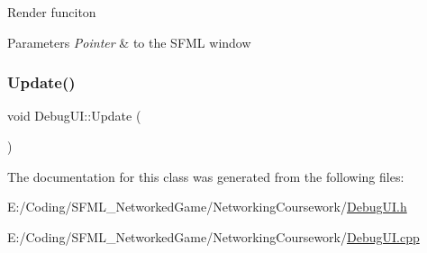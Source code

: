 Render funciton


\begin{DoxyParams}{Parameters}
{\em Pointer} & to the S\+F\+ML window \\
\hline
\end{DoxyParams}
\hypertarget{class_debug_u_i_a9cd779b785ef78f23ad8fb0f9e5e469a}{}\label{class_debug_u_i_a9cd779b785ef78f23ad8fb0f9e5e469a} 
\subsubsection{\texorpdfstring{Update()}{Update()}}
{\footnotesize\ttfamily void Debug\+U\+I\+::\+Update (\begin{DoxyParamCaption}{ }\end{DoxyParamCaption})}



The documentation for this class was generated from the following files\+:\begin{DoxyCompactItemize}
\item 
E\+:/\+Coding/\+S\+F\+M\+L\+\_\+\+Networked\+Game/\+Networking\+Coursework/\hyperlink{_debug_u_i_8h}{Debug\+U\+I.\+h}\item 
E\+:/\+Coding/\+S\+F\+M\+L\+\_\+\+Networked\+Game/\+Networking\+Coursework/\hyperlink{_debug_u_i_8cpp}{Debug\+U\+I.\+cpp}\end{DoxyCompactItemize}
